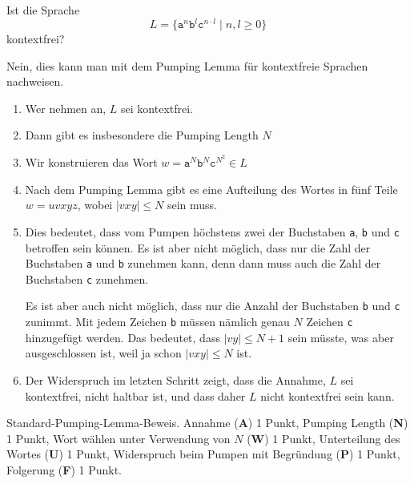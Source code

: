 Ist die Sprache 
\[
L=\{\texttt{a}^n\texttt{b}^l \texttt{c}^{n\cdot l}\;|\; n,l\ge 0\}
\]
kontextfrei?

\begin{loesung}
Nein, dies kann man mit dem Pumping Lemma für kontextfreie Sprachen
nachweisen.
\begin{enumerate}
\item
Wer nehmen an, $L$ sei kontextfrei.
\item
Dann gibt es insbesondere die Pumping Length $N$
\item
Wir konstruieren das Wort 
$w=\texttt{a}^N \texttt{b}^N \texttt{c}^{N^2}\in L$
\item 
Nach dem Pumping Lemma gibt es eine Aufteilung des Wortes in 
fünf Teile $w=uvxyz$, wobei $|vxy|\le N$ sein muss.
\item
Dies bedeutet, dass vom Pumpen höchstens zwei der Buchstaben
\texttt{a}, \texttt{b} und \texttt{c} betroffen sein können.
Es ist aber nicht möglich, dass nur die Zahl der Buchstaben
\texttt{a} und \texttt{b} zunehmen kann, denn dann muss auch
die Zahl der Buchstaben \texttt{c} zunehmen.

Es ist aber auch nicht möglich, dass nur die Anzahl der Buchstaben
\texttt{b} und \texttt{c} zunimmt.
Mit jedem Zeichen \texttt{b} müssen nämlich genau $N$ Zeichen
\texttt{c} hinzugefügt werden.
Das bedeutet, dass $|vy|\le N+1$ sein müsste, was aber ausgeschlossen
ist, weil ja schon $|vxy|\le N$ ist.
\item
Der Widerspruch im letzten Schritt zeigt, dass die Annahme,
$L$ sei kontextfrei, nicht haltbar ist, und dass daher $L$ nicht
kontextfrei sein kann.
\qedhere
\end{enumerate}
\end{loesung}

\begin{bewertung}
Standard-Pumping-Lemma-Beweis.
Annahme ({\bf A}) 1 Punkt,
Pumping Length ({\bf N}) 1 Punkt,
Wort wählen unter Verwendung von $N$ ({\bf W}) 1 Punkt,
Unterteilung des Wortes ({\bf U}) 1 Punkt,
Widerspruch beim Pumpen mit Begründung ({\bf P}) 1 Punkt,
Folgerung ({\bf F}) 1 Punkt.
\end{bewertung}
